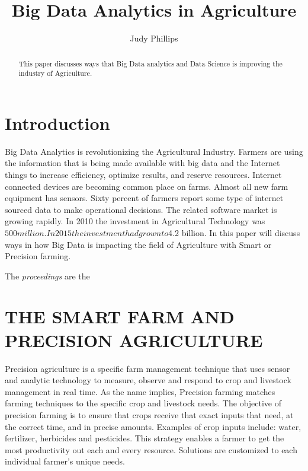 \documentclass[sigconf]{acmart}
\begin{document}
\title{Big Data Analytics in Agriculture}


\author{Judy Phillips}

\renewcommand{\shortauthors}{B. Trovato et al.}


\begin{abstract}
This paper discusses ways that Big Data analytics and Data Science is improving the industry of Agriculture.
\end{abstract}



\maketitle

\section{Introduction}

Big Data Analytics is revolutionizing the Agricultural Industry. Farmers are using the information that is being made available with big data and the Internet things to increase efficiency, optimize results, and reserve resources. Internet connected devices are becoming common place on farms. Almost all new farm equipment has sensors. Sixty percent of farmers report some type of internet sourced data to make operational decisions. The related software market is growing rapidly. In 2010 the investment in Agricultural Technology was $500 million. In 2015 the investment had grown to $4.2 billion.  In this paper will discuss ways in how Big Data is impacting the field of Agriculture with Smart or Precision farming.

The \textit{proceedings} are the \cite{VanGundy09}

\section{THE SMART FARM AND PRECISION AGRICULTURE}

Precision agriculture is a specific farm management technique that uses sensor and analytic technology to measure, observe and respond to crop and livestock management in real time.
As the name implies, Precision farming matches farming techniques to the specific crop and livestock needs. The objective of precision farming is to ensure that crops receive that exact inputs that need, at the correct time, and in precise amounts. Examples of crop inputs include: water, fertilizer, herbicides and pesticides. This strategy enables a farmer to get the most productivity out each and every resource. Solutions are customized to each individual farmer’s unique needs.
\end{document}

